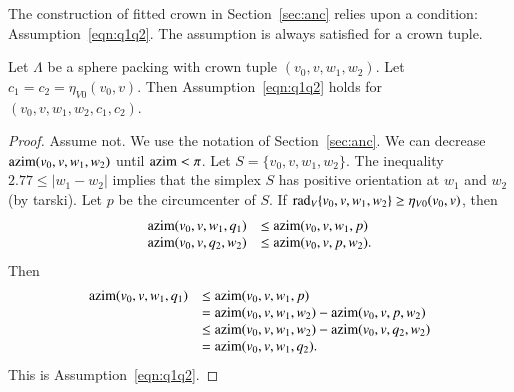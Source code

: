 The construction of fitted crown in Section~\ref{sec:anc} 
relies upon a condition: Assumption~\ref{eqn:q1q2}.  
The assumption is always satisfied for a crown tuple.

\begin{lemma}
Let $\Lambda$ be a sphere packing with crown tuple
$(v_0,v,w_1,w_2)$.  Let $c_1=c_2=\eta_{V0}(v_0,v)$. 
Then Assumption~\ref{eqn:q1q2} holds for $(v_0,v,w_1,w_2,c_1,c_2)$.
\end{lemma}

\begin{proof} Assume not.  
We use the notation of Section~\ref{sec:anc}.
We can decrease ${\operatorname{azim}}(v_0,v,w_1,w_2)$
until ${\operatorname{azim}}<\pi$.  Let $S=\{v_0,v,w_1,w_2\}$.
The inequality $2.77 \le |w_1-w_2|$ implies that the simplex $S$
has positive orientation at $w_1$ and $w_2$ (by tarski). 
Let $p$ be the circumcenter of $S$.
If $\operatorname{rad}_V\{v_0,v,w_1,w_2\}\ge\eta_{V0}(v_0,v)$, then
  $$
  \begin{array}{lll}
  {\operatorname{azim}}(v_0,v,w_1,q_1)&\le {\operatorname{azim}}(v_0,v,w_1,p)\\
  {\operatorname{azim}}(v_0,v,q_2,w_2)&\le {\operatorname{azim}}(v_0,v,p,w_2).
  \end{array}
  $$
Then 
  $$
  \begin{array}{lll}
  {\operatorname{azim}}(v_0,v,w_1,q_1) &\le {\operatorname{azim}}(v_0,v,w_1,p)\\
    &= {\operatorname{azim}}(v_0,v,w_1,w_2) - {\operatorname{azim}}(v_0,v,p,w_2)\\
    &\le {\operatorname{azim}}(v_0,v,w_1,w_2) - {\operatorname{azim}}(v_0,v,q_2,w_2)\\
    &= {\operatorname{azim}}(v_0,v,w_1,q_2).
  \end{array}
  $$
This is Assumption~\ref{eqn:q1q2}. 
\end{proof}




